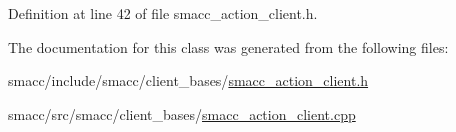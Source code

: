 Definition at line 42 of file smacc\+\_\+action\+\_\+client.\+h.



The documentation for this class was generated from the following files\+:\begin{DoxyCompactItemize}
\item 
smacc/include/smacc/client\+\_\+bases/\hyperlink{smacc__action__client_8h}{smacc\+\_\+action\+\_\+client.\+h}\item 
smacc/src/smacc/client\+\_\+bases/\hyperlink{smacc__action__client_8cpp}{smacc\+\_\+action\+\_\+client.\+cpp}\end{DoxyCompactItemize}
